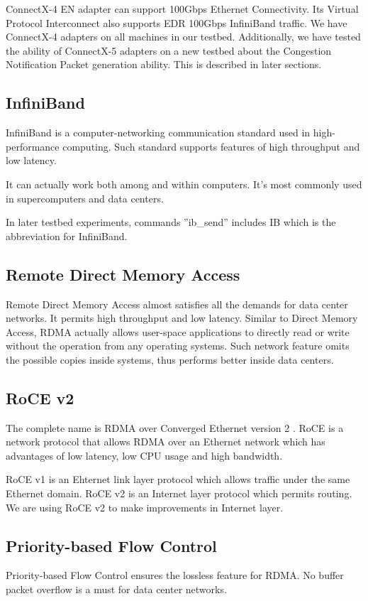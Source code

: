 \documentclass[12pt,a4paper]{article}
\begin{document}
ConnectX-4 EN adapter can support 100Gbps Ethernet Connectivity.
Its Virtual Protocol Interconnect also supports EDR 100Gbps InfiniBand traffic.
We have ConnectX-4 adapters on all machines in our testbed.
Additionally, we have tested the ability of ConnectX-5 adapters on a new testbed about the Congestion Notification Packet generation
ability.
This is described in later sections.

\subsection{InfiniBand}

InfiniBand is a computer-networking communication standard used in high-performance computing.
Such standard supports features of high throughput and low latency.

It can actually work both among and within computers. It's most commonly used in supercomputers and data centers.

In later testbed experiments, commands ''ib\_send'' includes IB which is the abbreviation for InfiniBand.

\subsection{Remote Direct Memory Access}
Remote Direct Memory Access almost satisfies all the demands for data center networks.
It permits high throughput and low latency.
Similar to Direct Memory Access, RDMA actually allows user-space applications to directly read or write without the operation from
any operating systems.
Such network feature omits the possible copies inside systems, thus performs better inside data centers.

\subsection{RoCE v2}

The complete name is RDMA over Converged Ethernet version 2 \cite{RoCEv2}.
RoCE is a network protocol that allows RDMA over an Ethernet network
which has advantages of low latency, low CPU usage and high bandwidth.

RoCE v1 is an Ehternet link layer protocol which allows traffic under the same Ethernet domain.
RoCE v2 is an Internet layer protocol which permits routing.
We are using RoCE v2 to make improvements in Internet layer.

\subsection{Priority-based Flow Control}
Priority-based Flow Control ensures the lossless feature for RDMA.
No buffer packet overflow is a must for data center networks.
\end{document}
